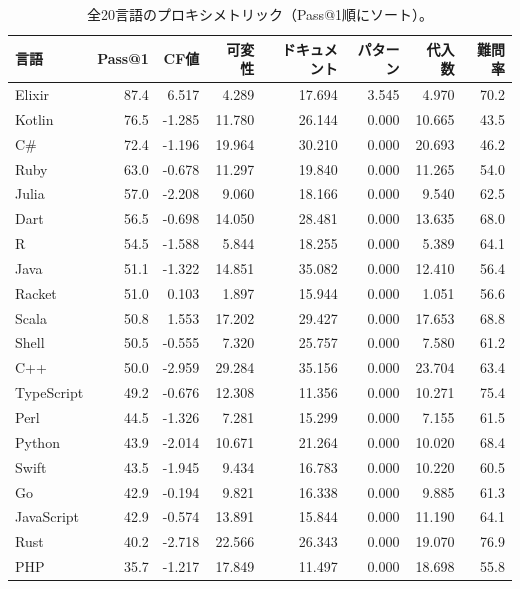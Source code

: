 \documentclass[11pt]{article}
\makeatletter
\newcommand{\passatone}{Pass@1}
\makeatother
\begin{document}
\begin{table}[H]
\centering
\caption{全20言語のプロキシメトリック（\passatone{}順にソート）。}
\label{tab:proxyfull}
\small
\begin{tabular}{lrrrrrrr}
\toprule
言語 & \passatone{} & CF値 & 可変性 & ドキュメント & パターン & 代入数 & 難問率 \\
\midrule
Elixir & 87.4 & 6.517 & 4.289 & 17.694 & 3.545 & 4.970 & 70.2 \\
Kotlin & 76.5 & -1.285 & 11.780 & 26.144 & 0.000 & 10.665 & 43.5 \\
C\# & 72.4 & -1.196 & 19.964 & 30.210 & 0.000 & 20.693 & 46.2 \\
Ruby & 63.0 & -0.678 & 11.297 & 19.840 & 0.000 & 11.265 & 54.0 \\
Julia & 57.0 & -2.208 & 9.060 & 18.166 & 0.000 & 9.540 & 62.5 \\
Dart & 56.5 & -0.698 & 14.050 & 28.481 & 0.000 & 13.635 & 68.0 \\
R & 54.5 & -1.588 & 5.844 & 18.255 & 0.000 & 5.389 & 64.1 \\
Java & 51.1 & -1.322 & 14.851 & 35.082 & 0.000 & 12.410 & 56.4 \\
Racket & 51.0 & 0.103 & 1.897 & 15.944 & 0.000 & 1.051 & 56.6 \\
Scala & 50.8 & 1.553 & 17.202 & 29.427 & 0.000 & 17.653 & 68.8 \\
Shell & 50.5 & -0.555 & 7.320 & 25.757 & 0.000 & 7.580 & 61.2 \\
C++ & 50.0 & -2.959 & 29.284 & 35.156 & 0.000 & 23.704 & 63.4 \\
TypeScript & 49.2 & -0.676 & 12.308 & 11.356 & 0.000 & 10.271 & 75.4 \\
Perl & 44.5 & -1.326 & 7.281 & 15.299 & 0.000 & 7.155 & 61.5 \\
Python & 43.9 & -2.014 & 10.671 & 21.264 & 0.000 & 10.020 & 68.4 \\
Swift & 43.5 & -1.945 & 9.434 & 16.783 & 0.000 & 10.220 & 60.5 \\
Go & 42.9 & -0.194 & 9.821 & 16.338 & 0.000 & 9.885 & 61.3 \\
JavaScript & 42.9 & -0.574 & 13.891 & 15.844 & 0.000 & 11.190 & 64.1 \\
Rust & 40.2 & -2.718 & 22.566 & 26.343 & 0.000 & 19.070 & 76.9 \\
PHP & 35.7 & -1.217 & 17.849 & 11.497 & 0.000 & 18.698 & 55.8 \\
\bottomrule
\end{tabular}
\end{table}
\end{document}
